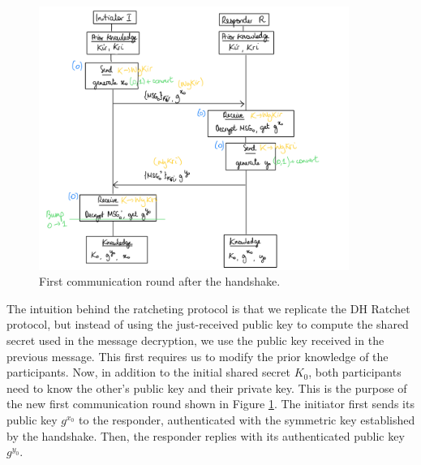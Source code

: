 \begin{figure}
    \centering
    \includegraphics[width=0.9\textwidth]{figures/DH-ratchet-modified-first.png}
    \caption{First communication round after the handshake.}
    \label{fig:dh-ratchet-modified-first}
\end{figure}

The intuition behind the ratcheting protocol is that we replicate the DH Ratchet protocol, but instead of using the just-received public key to compute the shared secret used in the message decryption, we use the public key received in the previous message.
This first requires us to modify the prior knowledge of the participants. Now, in addition to the initial shared secret $K_0$, both participants need to know the other's public key and their private key.
This is the purpose of the new first communication round shown in Figure \ref{fig:dh-ratchet-modified-first}. 
The initiator first sends its public key $g^{x_0}$ to the responder, authenticated with the symmetric key established by the handshake. Then, the responder replies with its authenticated public key $g^{y_0}$.

